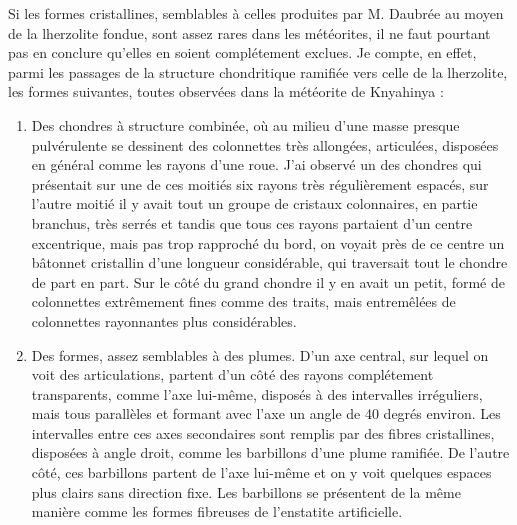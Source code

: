 \documentclass[a4paper, 12pt, oneside, french]{article}
\begin{document}
Si les formes cristallines, semblables à celles produites par M. Daubrée au moyen de la lherzolite fondue, sont assez rares dans les météorites, il ne faut pourtant pas en conclure qu'elles en soient complétement exclues. Je compte, en effet, parmi les passages de la structure chondritique ramifiée vers celle de la lherzolite, les formes suivantes, toutes observées dans la météorite de Knyahinya :
\begin{enumerate}
\item Des chondres à structure combinée, où au milieu d'une masse presque pulvérulente se dessinent des colonnettes très allongées, articulées, disposées en général comme les rayons d'une roue. J'ai observé un des chondres qui présentait sur une de ces moitiés six rayons très régulièrement espacés, sur l'autre moitié il y avait tout un groupe de cristaux colonnaires, en partie branchus, très serrés et tandis que tous ces rayons partaient d'un centre excentrique, mais pas trop rapproché du bord, on voyait près de ce centre un bâtonnet cristallin d'une longueur considérable, qui traversait tout le chondre de part en part. Sur le côté du grand chondre il y en avait un petit, formé de colonnettes extrêmement fines comme des traits, mais entremêlées de colonnettes rayonnantes plus considérables.
\item Des formes, assez semblables à des plumes. D'un axe central, sur lequel on voit des articulations, partent d'un côté des rayons complétement transparents, comme l'axe lui-même, disposés à des intervalles irréguliers, mais tous parallèles et formant avec l'axe un angle de 40 degrés environ. Les intervalles entre ces axes secondaires sont remplis par des fibres cristallines, disposées à angle droit, comme les barbillons d'une plume ramifiée. De l'autre côté, ces barbillons partent de l'axe lui-même et on y voit quelques espaces plus clairs sans direction fixe. Les barbillons se présentent de la même manière comme les formes fibreuses de l'enstatite artificielle.

\end{enumerate}
\end{document}
